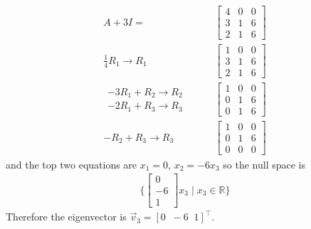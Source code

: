 \begin{example}
\begin{description}
\begin{align*}
A+3I = &\begin{bmatrix}
4 & 0 & 0 \\
3 & 1 & 6 \\
2 & 1 & 6
\end{bmatrix}\\
\frac{1}{4} R_1 \rightarrow R_1 \qquad & 
\begin{bmatrix}
1 & 0 & 0 \\
3 & 1 & 6 \\
2 & 1 & 6
\end{bmatrix}\\
\begin{array}{r}
-3R_1 + R_2 \rightarrow R_2 \\
-2R_1 + R_3 \rightarrow R_3 
\end{array} \qquad &
\begin{bmatrix}
1 & 0 & 0 \\
0 & 1 & 6 \\
0 & 1 & 6
\end{bmatrix}\\
-R_2 + R_3 \rightarrow R_3 \qquad & 
\begin{bmatrix}
1 & 0 & 0 \\
0 & 1 & 6 \\
0 & 0 & 0 
\end{bmatrix}
\end{align*}
%
and the top two equations are $x_1=0$, $x_2=-6x_3$ so the null space is
%
\begin{align*}
\{ \begin{bmatrix}
0 \\ -6 \\ 1
\end{bmatrix} x_3 \; | \; x_3 \in \mathbb{R} \}
\end{align*}
Therefore the eigenvector is  $\vec{v}_3=[0\;\;-6\;\;1]^{\intercal}$.  

\end{description}

\end{example}

